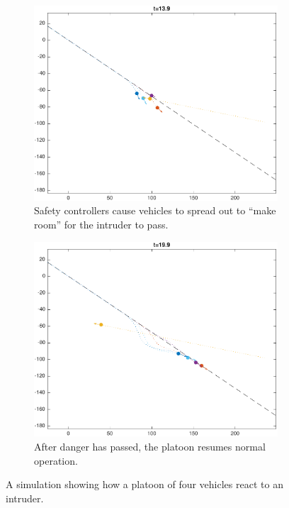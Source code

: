 \begin{figure}
    \begin{subfigure}[t]{0.45\columnwidth} \label{subfig:in_140}
        \includegraphics[width=\columnwidth]{fig/in_140}
        \caption{Safety controllers cause vehicles to spread out to ``make room'' for the intruder to pass.}
    \end{subfigure}
    \begin{subfigure}[t]{0.45\columnwidth} \label{subfig:in_200}
        \includegraphics[width=\columnwidth]{fig/in_200}
        \caption{After danger has passed, the platoon resumes normal operation.}
    \end{subfigure}   
    \caption{A simulation showing how a platoon of four vehicles react to an intruder. \label{fig:in}}
\end{figure}

